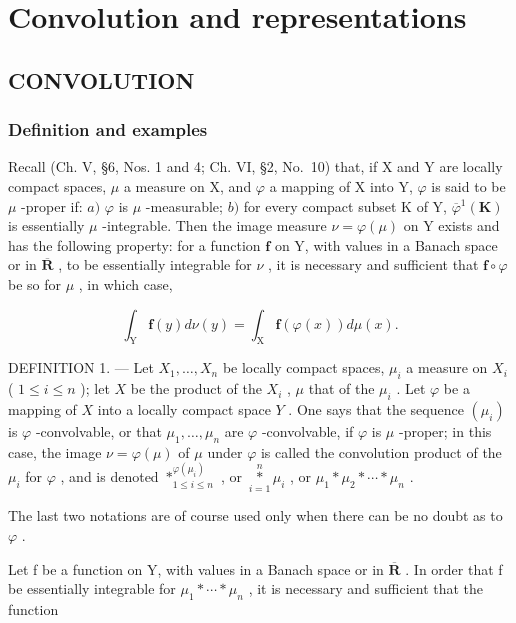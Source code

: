 \chapter{Convolution and representations}

\section{CONVOLUTION}

\subsection{Definition and examples}

Recall (Ch. V, §6, Nos. 1 and 4; Ch. VI, §2, No.~10) that, if X and Y are locally compact spaces, \(\mu\) a measure on X, and \(\varphi\) a mapping of X into Y, \(\varphi\) is said to be \(\mu\) -proper if: \(a)\) \(\varphi\) is \(\mu\) -measurable; \(b)\) for every compact subset K of Y, \(\overline{\varphi}^1 (\mathbf{K})\) is essentially \(\mu\) -integrable. Then the image measure \(\nu = \varphi (\mu)\) on Y exists and has the following property: for a function \(\mathbf{f}\) on Y, with values in a Banach space or in \(\overline{\mathbf{R}}\) , to be essentially integrable for \(\nu\) , it is necessary and sufficient that \(\mathbf{f} \circ \varphi\) be so for \(\mu\) , in which case,

\[
\int_ {\mathrm{Y}} \mathbf {f} (y) d \nu (y) = \int_ {\mathrm{X}} \mathbf {f} (\varphi (x)) d \mu (x).
\]

DEFINITION 1. --- Let \(X_1, \ldots, X_n\) be locally compact spaces, \(\mu_i\) a measure on \(X_i\) ( \(1 \leqslant i \leqslant n\) ); let \(X\) be the product of the \(X_i\) , \(\mu\) that of the \(\mu_i\) . Let \(\varphi\) be a mapping of \(X\) into a locally compact space \(Y\) . One says that the sequence \((\mu_i)\) is \(\varphi\) -convolvable, or that \(\mu_1, \ldots, \mu_n\) are \(\varphi\) -convolvable, if \(\varphi\) is \(\mu\) -proper; in this case, the image \(\nu = \varphi(\mu)\) of \(\mu\) under \(\varphi\) is called the convolution product of the \(\mu_i\) for \(\varphi\) , and is denoted \(*^{\varphi(\mu_i)}_{1 \leqslant i \leqslant n}\) , or \(\underset{i=1}{\overset{n}{*}} \mu_i\) , or \(\mu_1 * \mu_2 * \cdots * \mu_n\) .

The last two notations are of course used only when there can be no doubt as to \(\varphi\) .

Let f be a function on Y, with values in a Banach space or in \(\overline{\mathbf{R}}\) . In order that f be essentially integrable for \(\mu_{1}*\cdots*\mu_{n}\) , it is necessary and sufficient that the function

